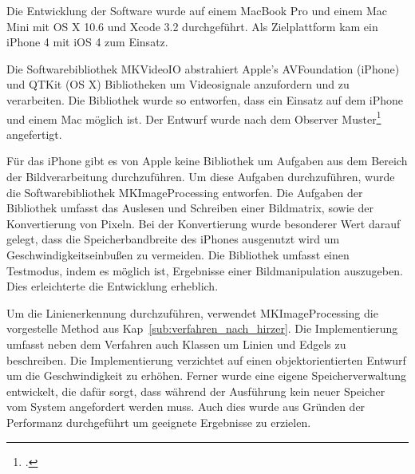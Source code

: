 Die Entwicklung der Software wurde auf einem MacBook Pro und einem Mac Mini mit OS X 10.6 und Xcode 3.2 durchgeführt. Als Zielplattform kam ein iPhone 4 mit iOS 4 zum Einsatz.

Die Softwarebibliothek MKVideoIO abstrahiert Apple's AVFoundation (iPhone) und QTKit (OS X) Bibliotheken um Videosignale anzufordern und zu verarbeiten. Die Bibliothek wurde so entworfen, dass ein Einsatz auf dem iPhone und einem Mac möglich ist. Der Entwurf wurde nach dem Observer Muster\footcite[Vgl.][S.~287--300]{gamma96} angefertigt.

Für das iPhone gibt es von Apple keine Bibliothek um Aufgaben aus dem Bereich der Bildverarbeitung durchzuführen. Um diese Aufgaben durchzuführen, wurde die Softwarebibliothek MKImageProcessing entworfen. Die Aufgaben der Bibliothek umfasst das Auslesen und Schreiben einer Bildmatrix, sowie der Konvertierung von Pixeln. Bei der Konvertierung wurde besonderer Wert darauf gelegt, dass die Speicherbandbreite des iPhones ausgenutzt wird um Geschwindigkeitseinbußen zu vermeiden. Die Bibliothek umfasst einen Testmodus, indem es möglich ist, Ergebnisse einer Bildmanipulation auszugeben. Dies erleichterte die Entwicklung erheblich.

Um die Linienerkennung durchzuführen, verwendet MKImageProcessing die vorgestelle Method aus Kap~\ref{sub:verfahren_nach_hirzer}. Die Implementierung umfasst neben dem Verfahren auch Klassen um Linien und Edgels zu beschreiben. Die Implementierung verzichtet auf einen objektorientierten Entwurf um die Geschwindigkeit zu erhöhen. Ferner wurde eine eigene Speicherverwaltung entwickelt, die dafür sorgt, dass während der Ausführung kein neuer Speicher vom System angefordert werden muss. Auch dies wurde aus Gründen der Performanz durchgeführt um geeignete Ergebnisse zu erzielen.


